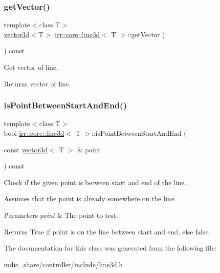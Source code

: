\subsubsection{\texorpdfstring{get\+Vector()}{getVector()}}
{\footnotesize\ttfamily template$<$class T$>$ \\
\hyperlink{classirr_1_1core_1_1vector3d}{vector3d}$<$T$>$ \hyperlink{classirr_1_1core_1_1line3d}{irr\+::core\+::line3d}$<$ T $>$\+::get\+Vector (\begin{DoxyParamCaption}{ }\end{DoxyParamCaption}) const\hspace{0.3cm}{\ttfamily [inline]}}



Get vector of line. 

\begin{DoxyReturn}{Returns}
vector of line. 
\end{DoxyReturn}
\mbox{\label{classirr_1_1core_1_1line3d_abe1e874f2058e965bc52802c41672fbc}} 
\subsubsection{\texorpdfstring{is\+Point\+Between\+Start\+And\+End()}{isPointBetweenStartAndEnd()}}
{\footnotesize\ttfamily template$<$class T$>$ \\
bool \hyperlink{classirr_1_1core_1_1line3d}{irr\+::core\+::line3d}$<$ T $>$\+::is\+Point\+Between\+Start\+And\+End (\begin{DoxyParamCaption}\item[{const \hyperlink{classirr_1_1core_1_1vector3d}{vector3d}$<$ T $>$ \&}]{point }\end{DoxyParamCaption}) const\hspace{0.3cm}{\ttfamily [inline]}}



Check if the given point is between start and end of the line. 

Assumes that the point is already somewhere on the line. 
\begin{DoxyParams}{Parameters}
{\em point} & The point to test. \\
\hline
\end{DoxyParams}
\begin{DoxyReturn}{Returns}
True if point is on the line between start and end, else false. 
\end{DoxyReturn}


The documentation for this class was generated from the following file\+:\begin{DoxyCompactItemize}
\item 
indie\+\_\+share/controller/include/line3d.\+h\end{DoxyCompactItemize}
